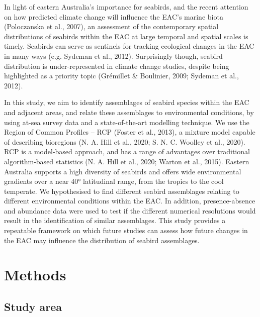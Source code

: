 \documentclass{article}
\begin{document}
\begin{linenumbers}
In light of eastern Australia's importance for seabirds, and the recent attention on how predicted climate change will influence the EAC's marine biota (Poloczanska et al., 2007), an assessment of the contemporary spatial distributions of seabirds within the EAC at large temporal and spatial scales is timely. Seabirds can serve as sentinels for tracking ecological changes in the EAC in many ways (e.g. Sydeman et al., 2012). Surprisingly though, seabird distribution is under-represented in climate change studies, despite being highlighted as a priority topic (Grémillet \& Boulinier, 2009; Sydeman et al., 2012).

In this study, we aim to identify assemblages of seabird species within the EAC and adjacent areas, and relate these assemblages to environmental conditions, by using at-sea survey data and a state-of-the-art modelling technique. We use the Region of Common Profiles -- RCP (Foster et al., 2013), a mixture model capable of describing bioregions (N. A. Hill et al., 2020; S. N. C. Woolley et al., 2020). RCP is a model-based approach, and has a range of advantages over traditional algorithm-based statistics (N. A. Hill et al., 2020; Warton et al., 2015). Eastern Australia supports a high diversity of seabirds and offers wide environmental gradients over a near 40° latitudinal range, from the tropics to the cool temperate. We hypothesised to find different seabird assemblages relating to different environmental conditions within the EAC. In addition, presence-absence and abundance data were used to test if the different numerical resolutions would result in the identification of similar assemblages. This study provides a repeatable framework on which future studies can assess how future changes in the EAC may influence the distribution of seabird assemblages.

\hypertarget{methods}{%
\section{Methods}\label{methods}}

\hypertarget{study-area}{%
\subsection{Study area}\label{study-area}}


\end{linenumbers}
\end{document}
